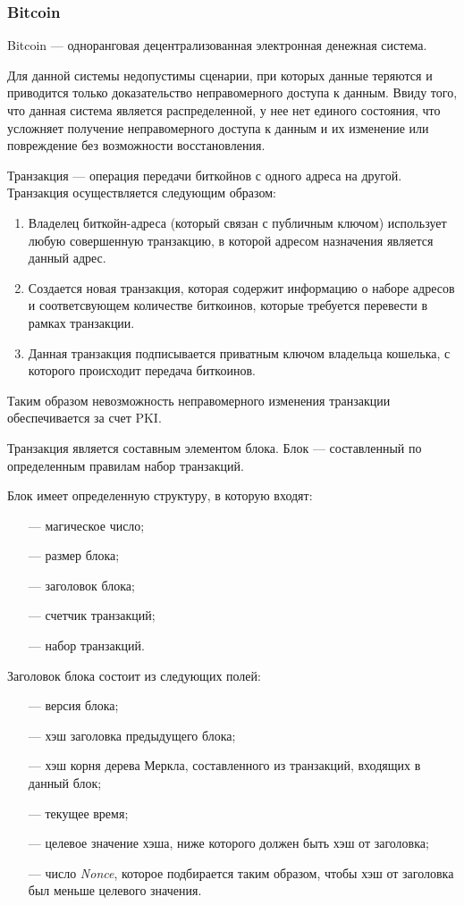 \clearpage

\subsubsection{Bitcoin}

Bitcoin\cite{bitcoin} --- одноранговая децентрализованная электронная денежная система.

Для данной системы недопустимы сценарии, при которых данные теряются и приводится только доказательство неправомерного доступа к данным. Ввиду того, что данная система является распределенной, у нее нет единого состояния, что усложняет получение неправомерного доступа к данным и их изменение или повреждение без возможности восстановления.

Транзакция --- операция передачи биткойнов с одного адреса на другой. Транзакция осуществляется следующим образом:

\begin{enumerate}
    \item Владелец биткойн-адреса (который связан с публичным ключом) использует любую совершенную транзакцию, в которой адресом назначения является данный адрес.
    \item Создается новая транзакция, которая содержит информацию о наборе адресов и соответсвующем количестве биткоинов, которые требуется перевести в рамках транзакции.
    \item Данная транзакция подписывается приватным ключом владельца кошелька, с которого происходит передача биткоинов.
\end{enumerate}

Таким образом невозможность неправомерного изменения транзакции обеспечивается за счет PKI\cite{pki}.

Транзакция является составным элементом блока. Блок --- составленный по определенным правилам набор транзакций.

Блок имеет определенную структуру, в которую входят:
\begin{itemize}
    \item[---] магическое число;
    \item[---] размер блока;
    \item[---] заголовок блока;
    \item[---] счетчик транзакций;
    \item[---] набор транзакций.
\end{itemize}

Заголовок блока состоит из следующих полей:
\begin{itemize}
    \item[---] версия блока;
    \item[---] хэш заголовка предыдущего блока;
    \item[---] хэш корня дерева Меркла, составленного из транзакций, входящих в данный блок;
    \item[---] текущее время;
    \item[---] целевое значение хэша, ниже которого должен быть хэш от заголовка;
    \item[---] число \textit{Nonce}, которое подбирается таким образом, чтобы хэш от заголовка был меньше целевого значения.
\end{itemize}

